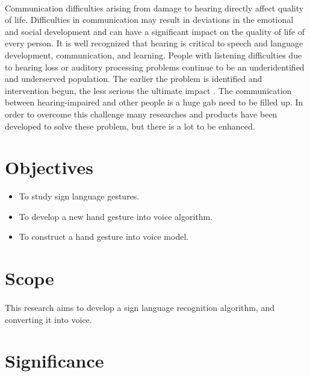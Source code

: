 \documentclass[12pt]{report}
\begin{document}
            \paragraph{}
                Communication difficulties arising from damage to hearing
                directly affect quality of life. Difficulties in communication may
                result in deviations in the emotional and social development and
                can have a significant impact on the quality of life of every person.
                It is well recognized that hearing is critical to speech and language
                development, communication, and learning. People with listening
                difficulties due to hearing loss or auditory processing problems
                continue to be an underidentified and underserved population. The
                earlier the problem is identified and intervention begun, the less
                serious the ultimate impact \cite{Frajtag12017}.
                The communication between hearing-impaired and other people is
                a huge gab need to be filled up. In order to overcome this challenge 
                many researches and products have been developed to solve these problem, 
                but there is a lot to be enhanced.
        
        \section{Objectives}
            \begin{itemize}
                \item To study sign language gestures.
                \item To develop a new hand gesture into voice algorithm.
                \item To construct a hand gesture into voice model.
            \end{itemize}
        
        \section{Scope}
            \paragraph{}
                This research aims to develop a sign language recognition algorithm,
                and converting it into voice.
        \section{Significance}
\end{document}
